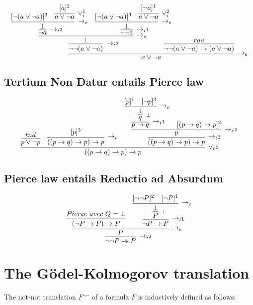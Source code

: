 \documentclass[english]{smfart}
\theoremstyle{plain}
\begin{document}
$$
\infer[{\rightarrow_e}] 
{a\lor \lnot a} 
{
\infer[{\rightarrow_i \scriptstyle{3}}]{\lnot\lnot (a\lor \lnot a)}
{\infer[{\rightarrow_e}] {\bot} 
{{
\infer[{\rightarrow_i \scriptstyle{2}}]{\lnot a} 
{\infer[{\rightarrow_e}]
{\bot} 
{[\lnot(a\lor \lnot a)]^3 
& \infer[{\lor_i^1}]{a\lor \lnot a} {[a]^2} 
}}} & {
\infer[{\rightarrow_i \scriptstyle{1}}]
{\lnot \lnot a} 
{\infer[{\rightarrow_e}]{\bot}{[\lnot(a\lor \lnot a)]^3 & \infer[{\lor_i^2}]{a\lor \lnot a}{[\lnot a]^1}}}
}}}
&\hspace*{-5ex}  \infer{\lnot\lnot (a\lor \lnot a)\rightarrow (a\lor \lnot a)}{raa}
}
$$

\subsection{Tertium Non Datur entails Pierce law} 

 

$$
\infer[\lor_e \scriptstyle{3}]{((p\rightarrow q)\rightarrow p)\rightarrow p}
{\infer{p\lor \lnot p}{tnd} & {
\infer[\rightarrow_i]{((p\rightarrow q)\rightarrow p) \rightarrow p}{[p]^3}
} & {
\infer[\rightarrow_i \scriptstyle{2}]{((p\rightarrow q)\rightarrow p)\rightarrow p}{
\infer[{\rightarrow_e \scriptstyle{2}}]{p}{ {
\infer[{\rightarrow_i \scriptstyle{1}}]
{p\rightarrow q}
{\infer[\scriptstyle{\bot}]{q}{\infer[{\rightarrow_e}]{\bot}{{[p]^1} & {[\lnot p]^3}}}}
} & {[(p\rightarrow q)\rightarrow p]^2}  }
}
}} 
$$

\subsection{Pierce law entails Reductio ad Absurdum} 

$$
\infer[{\rightarrow_i \scriptstyle{2}}]{\lnot\lnot P \rightarrow P}
{\infer[{\rightarrow_e}]{P}{\infer{(\lnot P \rightarrow P)\rightarrow P}{Pierce\ avec\ Q=\bot} & {
\infer[{\rightarrow_i \scriptstyle{1}}]{\lnot P \rightarrow P}{\infer[{\scriptstyle{\bot}}]{P}{\infer[\rightarrow_e]{\bot}{[\lnot \lnot P]^2 & [\lnot P]^1}}}
}}}
$$

\section{The G\"odel-Kolmogorov translation}

The not-not translation $F{^{\lnot\lnot}}$ of a formula $F$ is inductively defined as follows: 
\end{document}
